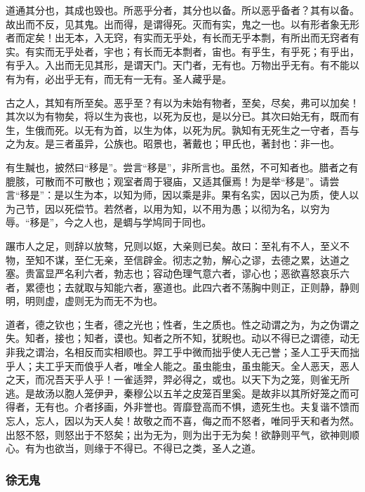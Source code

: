 \documentclass[]{article}
\begin{document}
道通其分也，其成也毁也。所恶乎分者，其分也以备。所以恶乎备者？其有以备。故出而不反，见其鬼。出而得，是谓得死。灭而有实，鬼之一也。以有形者象无形者而定矣！出无本，入无窍，有实而无乎处，有长而无乎本剽，有所出而无窍者有实。有实而无乎处者，宇也；有长而无本剽者，宙也。有乎生，有乎死；有乎出，有乎入。入出而无见其形，是谓天门。天门者，无有也。万物出乎无有。有不能以有为有，必出乎无有，而无有一无有。圣人藏乎是。

古之人，其知有所至矣。恶乎至？有以为未始有物者，至矣，尽矣，弗可以加矣！其次以为有物矣，将以生为丧也，以死为反也，是以分已。其次曰始无有，既而有生，生俄而死。以无有为首，以生为体，以死为尻。孰知有无死生之一守者，吾与之为友。是三者虽异，公族也。昭景也，著戴也；甲氏也，著封也：非一也。

有生黬也，披然曰``移是''。尝言``移是''，非所言也。虽然，不可知者也。腊者之有膍胲，可散而不可散也；观室者周于寝庙，又适其偃焉！为是举``移是''。请尝言``移是''：是以生为本，以知为师，因以乘是非。果有名实，因以己为质，使人以为己节，因以死偿节。若然者，以用为知，以不用为愚；以彻为名，以穷为辱。``移是''，今之人也，是蜩与学鸠同于同也。

蹍市人之足，则辞以放骜，兄则以妪，大亲则已矣。故曰：至礼有不人，至义不物，至知不谋，至仁无亲，至信辟金。彻志之勃，解心之谬，去德之累，达道之塞。贵富显严名利六者，勃志也；容动色理气意六者，谬心也；恶欲喜怒哀乐六者，累德也；去就取与知能六者，塞道也。此四六者不荡胸中则正，正则静，静则明，明则虚，虚则无为而无不为也。

道者，德之钦也；生者，德之光也；性者，生之质也。性之动谓之为，为之伪谓之失。知者，接也；知者，谟也。知者之所不知，犹睨也。动以不得已之谓德，动无非我之谓治，名相反而实相顺也。羿工乎中微而拙乎使人无己誉；圣人工乎天而拙乎人；夫工乎天而俍乎人者，唯全人能之。虽虫能虫，虽虫能天。全人恶天，恶人之天，而况吾天乎人乎！一雀适羿，羿必得之，或也。以天下为之笼，则雀无所逃。是故汤以胞人笼伊尹，秦穆公以五羊之皮笼百里奚。是故非以其所好笼之而可得者，无有也。介者拸画，外非誉也。胥靡登高而不惧，遗死生也。夫复谐不馈而忘人，忘人，因以为天人矣！故敬之而不喜，侮之而不怒者，唯同乎天和者为然。出怒不怒，则怒出于不怒矣；出为无为，则为出于无为矣！欲静则平气，欲神则顺心。有为也欲当，则缘于不得已。不得已之类，圣人之道。

\hypertarget{header-n394}{%
\subsubsection{徐无鬼}\label{header-n394}}
\end{document}
